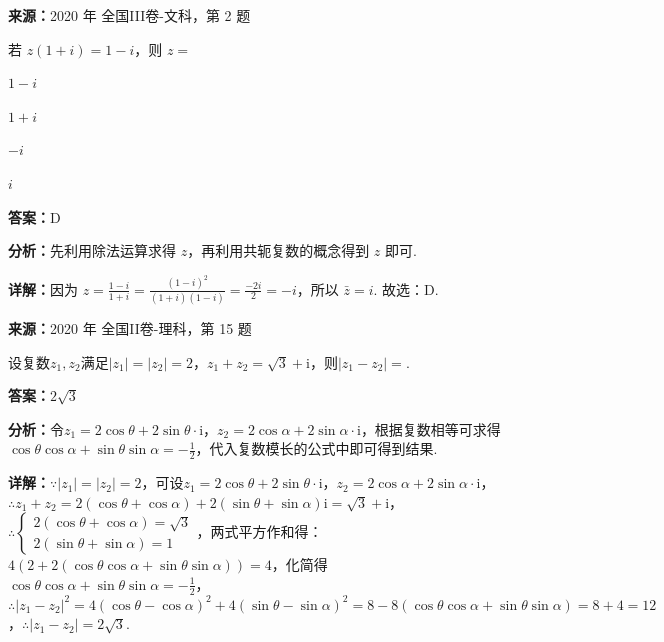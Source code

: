 \begin{question}[points=5]
\textbf{来源：}2020 年 全国III卷-文科，第 2 题\par
若 $z(1+i)=1-i$，则 $z=$
\begin{choices}
  \item $1-i$
  \item $1+i$
  \item $-i$
  \item $i$
\end{choices}
\begin{solution}
\textbf{答案：}D

\textbf{分析：}先利用除法运算求得 $z$，再利用共轭复数的概念得到 $z$ 即可.

\textbf{详解：}因为 $z=\frac{1-i}{1+i}=\frac{(1-i)^2}{(1+i)(1-i)}=\frac{-2i}{2}=-i$，所以 $\bar{z}=i$. 故选：D.
\end{solution}
\end{question}

\begin{question}[points=5]
\textbf{来源：}2020 年 全国II卷-理科，第 15 题\par
设复数$z_1,z_2$满足$|z_1|=|z_2|=2$，$z_1+z_2=\sqrt3+\mathrm{i}$，则$|z_1-z_2|=$.
\fillin[{$2\sqrt3$}]
\begin{solution}
\textbf{答案：}$2\sqrt3$

\textbf{分析：}令$z_1=2\cos\theta+2\sin\theta\cdot\mathrm{i}$，$z_2=2\cos\alpha+2\sin\alpha\cdot\mathrm{i}$，根据复数相等可求得$\cos\theta\cos\alpha+\sin\theta\sin\alpha=-\frac12$，代入复数模长的公式中即可得到结果.

\textbf{详解：}$\because|z_1|=|z_2|=2$，可设$z_1=2\cos\theta+2\sin\theta\cdot\mathrm{i}$，$z_2=2\cos\alpha+2\sin\alpha\cdot\mathrm{i}$，$\therefore z_1+z_2=2(\cos\theta+\cos\alpha)+2(\sin\theta+\sin\alpha)\mathrm{i}=\sqrt3+\mathrm{i}$，$\therefore\begin{cases}2(\cos\theta+\cos\alpha)=\sqrt3\\2(\sin\theta+\sin\alpha)=1\end{cases}$，两式平方作和得：$4(2+2(\cos\theta\cos\alpha+\sin\theta\sin\alpha))=4$，化简得$\cos\theta\cos\alpha+\sin\theta\sin\alpha=-\frac12$，$\therefore|z_1-z_2|^2=4(\cos\theta-\cos\alpha)^2+4(\sin\theta-\sin\alpha)^2=8-8(\cos\theta\cos\alpha+\sin\theta\sin\alpha)=8+4=12$，$\therefore|z_1-z_2|=2\sqrt3$.
\end{solution}
\end{question}

